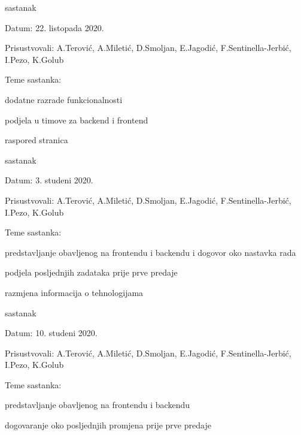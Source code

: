 \begin{packed_enum}
	\item  sastanak
	\item[] \begin{packed_item}
		\item Datum: 22. listopada 2020.
		\item Prisustvovali: A.Terović, A.Miletić, D.Smoljan, E.Jagodić, F.Sentinella-Jerbić, I.Pezo, K.Golub
		\item Teme sastanka:
		\begin{packed_item}
			\item dodatne razrade funkcionalnosti
			\item podjela u timove za backend i frontend
			\item raspored stranica
		\end{packed_item}
	\end{packed_item}
	
	\item  sastanak
	\item[] \begin{packed_item}
		\item Datum: 3. studeni 2020.
		\item Prisustvovali: A.Terović, A.Miletić, D.Smoljan, E.Jagodić, F.Sentinella-Jerbić, I.Pezo, K.Golub
		\item Teme sastanka:
		\begin{packed_item}
			\item predstavljanje obavljenog na frontendu i backendu i dogovor oko nastavka rada
			\item podjela posljednjih zadataka prije prve predaje
			\item razmjena informacija o tehnologijama
		\end{packed_item}
	\end{packed_item}
	
	\item  sastanak
	\item[] \begin{packed_item}
		\item Datum: 10. studeni 2020.
		\item Prisustvovali: A.Terović, A.Miletić, D.Smoljan, E.Jagodić, F.Sentinella-Jerbić, I.Pezo, K.Golub
		\item Teme sastanka:
		\begin{packed_item}
			\item predstavljanje obavljenog na frontendu i backendu
			\item dogovaranje oko posljednjih promjena prije prve predaje
		\end{packed_item}
	\end{packed_item}
	

\end{packed_enum}
